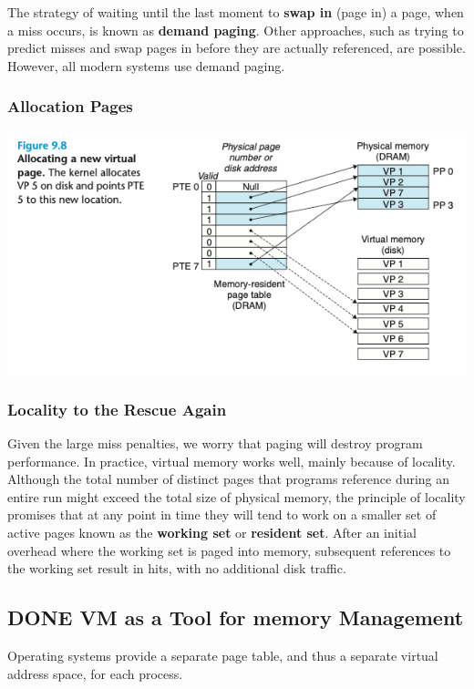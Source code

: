 \documentclass[11pt]{article}
\begin{document}
The strategy of waiting until the last moment to \textbf{swap in} (page in) a page, when a miss occurs, is known as \textbf{demand paging}. Other approaches, such as trying to predict misses and swap pages in before they are actually referenced, are possible. However, all modern systems use demand paging.\\

\subsubsection{Allocation Pages}
\label{sec:org3e4fbde}

\begin{center}
\includegraphics[width=.9\linewidth]{pics/figure9.8-allocate-page.png}
\end{center}

\subsubsection{Locality to the Rescue Again}
\label{sec:org4db89ee}
Given the large miss penalties, we worry that paging will destroy program performance. In practice, virtual memory works well, mainly because of locality.\\

Although the total number of distinct pages that programs reference during an entire run might exceed the total size of physical memory, the principle of locality promises that at any point in time they will tend to work on a smaller set of active pages known as the \textbf{working set} or \textbf{resident set}. After an initial overhead where the working set is paged into memory, subsequent references to the working set result in hits, with no additional disk traffic.\\

\subsection{{\bfseries\sffamily DONE} VM as a Tool for memory Management}
\label{sec:orgd6adb2e}
Operating systems provide a separate page table, and thus a separate virtual address space, for each process.\\
\end{document}
